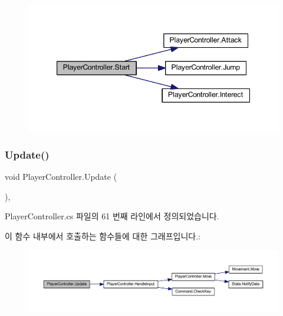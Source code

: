 \begin{figure}[H]
\begin{center}
\leavevmode
\includegraphics[width=347pt]{dc/dde/class_player_controller_ae1117d9c4da3193181cddad2c814e467_cgraph}
\end{center}
\end{figure}
\mbox{\label{class_player_controller_ae8bc83dffb99867a04be016473ed2c43}} 
\subsubsection{\texorpdfstring{Update()}{Update()}}
{\footnotesize\ttfamily void Player\+Controller.\+Update (\begin{DoxyParamCaption}{ }\end{DoxyParamCaption})\hspace{0.3cm}{\ttfamily [inline]}, {\ttfamily [private]}}



Player\+Controller.\+cs 파일의 61 번째 라인에서 정의되었습니다.


\begin{DoxyCode}{0}

\end{DoxyCode}
이 함수 내부에서 호출하는 함수들에 대한 그래프입니다.\+:
\nopagebreak
\begin{figure}[H]
\begin{center}
\leavevmode
\includegraphics[width=350pt]{dc/dde/class_player_controller_ae8bc83dffb99867a04be016473ed2c43_cgraph}
\end{center}
\end{figure}



